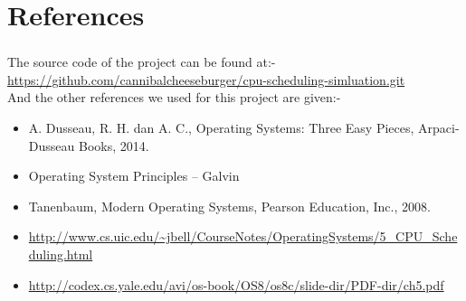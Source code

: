 \documentclass[11pt,a4paper]{report}
\begin{document}
\chapter{References}
\vskip 1cm
{\subsection*{}
{\large{The source code of the project can be found at:-}\\
	\url{https://github.com/cannibalcheeseburger/cpu-scheduling-simluation.git}\\
\large{	And the other references we used for this project are given:-}
\begin{itemize}
\item 	A. Dusseau, R. H. dan A. C., Operating Systems: Three Easy Pieces, Arpaci-Dusseau Books, 2014.
\item Operating System Principles – Galvin
\item Tanenbaum, Modern Operating Systems, Pearson Education, Inc., 2008.
\item 	\url{http://www.cs.uic.edu/~jbell/CourseNotes/OperatingSystems/5_CPU_Scheduling.html}
\item \url{http://codex.cs.yale.edu/avi/os-book/OS8/os8c/slide-dir/PDF-dir/ch5.pdf}
\end{itemize}
}
}
\end{document}
